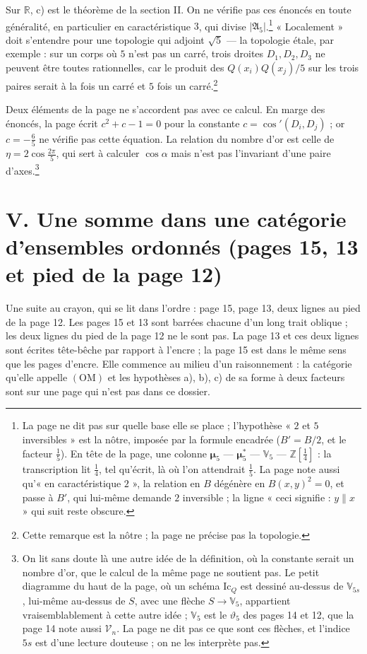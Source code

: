 \documentclass[11pt,a4paper]{article}
\begin{document}
Sur $\mathbb{R}$, c) est le théorème de la section II. On ne vérifie pas ces
énoncés en toute généralité, en particulier en caractéristique $3$, qui
divise $|\mathfrak{A}_5|$.\footnote{La page ne dit pas sur quelle base elle
se place ; l'hypothèse « $2$ et $5$ inversibles » est la nôtre, imposée par la
formule encadrée ($B' = B/2$, et le facteur $\frac15$). En tête de la page,
une colonne $\boldsymbol{\mu}_5$ --- $\boldsymbol{\mu}_5^{*}$ ---
$\mathbb{V}_5$ --- $\mathbb{Z}[\frac14]$ : la transcription lit $\frac14$,
tel qu'écrit, là où l'on attendrait $\frac15$. La page note aussi
qu'« en caractéristique $2$ », la relation en $B$ dégénère en
$B(x,y)^{2} = 0$, et passe à $B'$, qui lui-même demande $2$ inversible ; la
ligne « ceci signifie : $y \parallel x$ » qui suit reste obscure.} « Localement »
doit s'entendre pour une topologie qui adjoint $\sqrt5$ --- la topologie
étale, par exemple : sur un corps où $5$ n'est pas un carré, trois droites
$D_1, D_2, D_3$ ne peuvent être toutes rationnelles, car le produit des
$Q(x_i)Q(x_j)/5$ sur les trois paires serait à la fois un carré et $5$ fois
un carré.\footnote{Cette remarque est la nôtre ; la page ne précise pas la
topologie.}

Deux éléments de la page ne s'accordent pas avec ce calcul. En marge des
énoncés, la page écrit $c^{2} + c - 1 = 0$ pour la constante
$c = \cos'(D_i, D_j)$ ; or $c = -\frac65$ ne vérifie pas cette équation. La
relation du nombre d'or est celle de $\eta = 2\cos\frac{2\pi}{5}$, qui sert à
calculer $\cos\alpha$ mais n'est pas l'invariant d'une paire
d'axes.\footnote{On lit sans doute là une autre idée de la définition,
où la constante serait un nombre d'or, que le calcul de la même page ne
soutient pas. Le petit diagramme du haut de la page, où un schéma
$\mathrm{Ic}_Q$ est dessiné au-dessus de $\mathbb{V}_{5s}$, lui-même au-dessus
de $S$, avec une flèche $S \to \mathbb{V}_5$, appartient vraisemblablement à
cette autre idée ; $\mathbb{V}_5$ est le $\vartheta_5$ des pages 14 et 12,
que la page 14 note aussi $\mathcal{V}_n$. La page ne dit pas ce que sont
ces flèches, et l'indice $5s$ est d'une lecture douteuse ; on ne les
interprète pas.}

\section*{V. Une somme dans une catégorie d'ensembles ordonnés (pages 15, 13 et pied de la page 12)}

Une suite au crayon, qui se lit dans l'ordre : page 15, page 13, deux lignes
au pied de la page 12. Les pages 15 et 13 sont barrées chacune d'un long
trait oblique ; les deux lignes du pied de la page 12 ne le sont pas. La page
13 et ces deux lignes sont écrites tête-bêche par rapport à l'encre ; la page
15 est dans le même sens que les pages d'encre. Elle commence au milieu d'un raisonnement : la catégorie qu'elle
appelle $(\mathrm{OM})$ et les hypothèses a), b), c) de sa forme à deux
facteurs sont sur une page qui n'est pas dans ce dossier.
\end{document}
